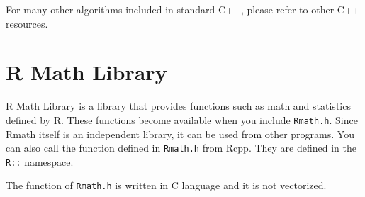 \documentclass[
]{book}
\begin{document}
For many other algorithms included in standard C++, please refer to other C++ resources.

\hypertarget{r-math-library}{%
\chapter{R Math Library}\label{r-math-library}}

R Math Library is a library that provides functions such as math and statistics defined by R. These functions become available when you include \texttt{Rmath.h}. Since Rmath itself is an independent library, it can be used from other programs. You can also call the function defined in \texttt{Rmath.h} from Rcpp. They are defined in the \texttt{R::} namespace.

The function of \texttt{Rmath.h} is written in C language and it is not vectorized.
\end{document}
